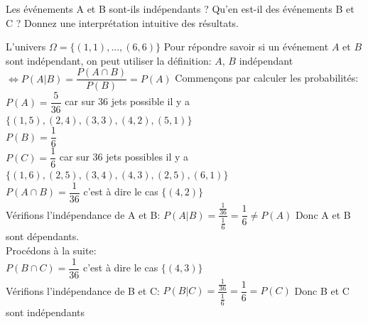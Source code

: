 	\begin{exo}
		\begin{subexo}{Les événements A et B sont-ils indépendants ? Qu’en est-il des événements B et C ? Donnez une interprétation intuitive des résultats.}
			\begin{flushleft}
				L'univers $\Omega = \{(1,1),...,(6,6)\}$ Pour répondre savoir si un événement $A$ et $B$ sont indépendant, on peut utiliser la définition: $A$, $B$ indépendant $\Leftrightarrow P(A | B) = \dfrac{P(A \cap B)}{P(B)}=P(A)$ Commençons par calculer les probabilités:
				\\$P(A) = \dfrac{5}{36}$ car sur 36 jets possible il y a $\{(1,5),(2,4),(3,3),(4,2),(5,1)\}$
				\\$P(B) = \dfrac{1}{6}$
				\\$P(C) = \dfrac{1}{6}$ car sur 36 jets possibles il y a $\{(1,6),(2,5),(3,4),(4,3),(2,5),(6,1)\}$
				\\$P(A \cap B) = \dfrac{1}{36}$ c'est à dire le cas $\{(4,2)\}$
				\\Vérifions l'indépendance de A et B: $P(A | B) = \dfrac{\frac{1}{36}}{\frac{1}{6}}=\dfrac{1}{6} \neq P(A)$ Donc A et B sont dépendants.
				\\ Procédons à la suite:
				\\$P(B\cap C) = \dfrac{1}{36}$ c'est à dire le cas $\{(4,3)\}$
				\\Vérifions l'indépendance de B et C: $P(B | C) = \dfrac{\frac{1}{36}}{\frac{1}{6}}=\dfrac{1}{6} = P(C)$ Donc B et C sont indépendants
			\end{flushleft}
		\end{subexo}
	\end{exo}
